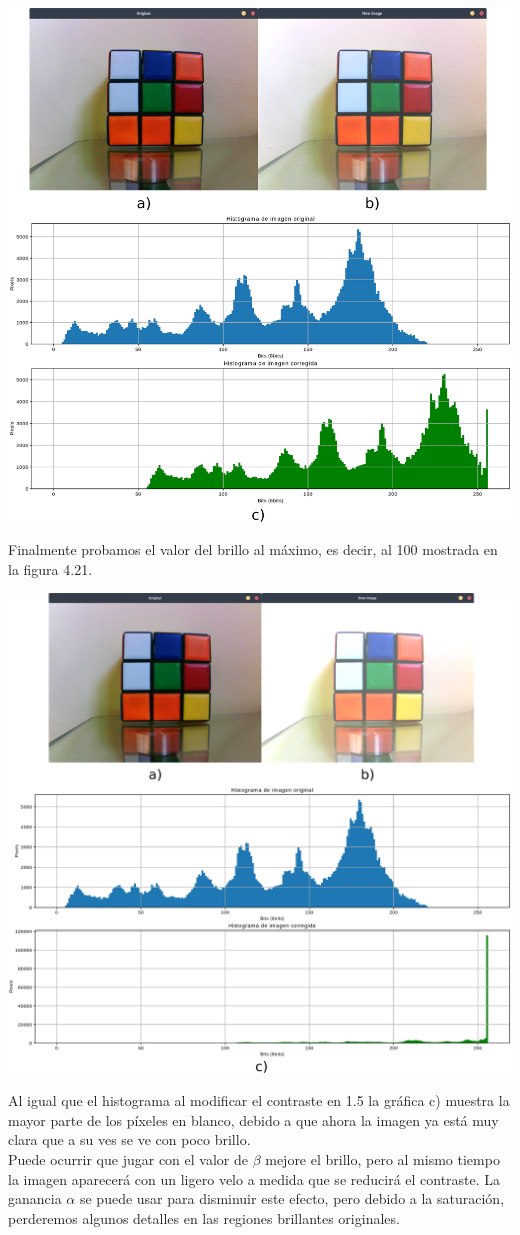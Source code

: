 \begin{center}
	\includegraphics[width=0.7 \textwidth]{Contenido/Cuerpo/Capitulo4/Fig21.eps}
	\label{Fig9}
\end{center}
Finalmente probamos el valor del brillo al máximo, es decir, al 100 mostrada en la figura 4.21.
\begin{center}
	\includegraphics[width=0.7 \textwidth]{Contenido/Cuerpo/Capitulo4/Fig22.eps}
	\label{Fig9}
\end{center}
Al igual que el histograma al modificar el contraste en 1.5 la gráfica c) muestra la mayor parte de los píxeles en blanco, debido
a que ahora la imagen ya está muy clara que a su ves se ve con poco brillo.\\
Puede ocurrir que jugar con el valor de $\beta$ mejore el brillo, pero al mismo tiempo la imagen aparecerá con un ligero
velo a medida que se reducirá el contraste. La ganancia $\alpha$ se puede usar para disminuir este efecto, pero debido a la
saturación, perderemos algunos detalles en las regiones brillantes originales.
